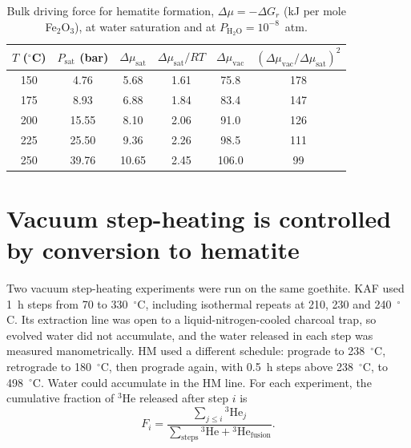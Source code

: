 \begin{table}
  \centering
  \caption{Bulk driving force for hematite formation, $\Delta\mu = -\Delta G_r$ (kJ per mole Fe$_2$O$_3$), at water saturation and at $P_{\mathrm{H_2O}} = 10^{-8}$~atm.}
  \label{tab:gt_dmu}
  \begin{tabular}{cccccc}
    \hline
    $T$ ($^\circ$C) & $P_{\mathrm{sat}}$ (bar) & $\Delta\mu_{\mathrm{sat}}$ & $\Delta\mu_{\mathrm{sat}}/RT$ & $\Delta\mu_{\mathrm{vac}}$ & $(\Delta\mu_{\mathrm{vac}}/\Delta\mu_{\mathrm{sat}})^2$ \\
    \hline
    150 & 4.76  & 5.68  & 1.61 & 75.8  & 178 \\
    175 & 8.93  & 6.88  & 1.84 & 83.4  & 147 \\
    200 & 15.55 & 8.10  & 2.06 & 91.0  & 126 \\
    225 & 25.50 & 9.36  & 2.26 & 98.5  & 111 \\
    250 & 39.76 & 10.65 & 2.45 & 106.0 & 99  \\
    \hline
  \end{tabular}
\end{table}

\section{Vacuum step-heating is controlled by conversion to hematite}
\label{sec:gt_vacuum}

Two vacuum step-heating experiments were run on the same goethite. KAF used 1~h steps from
70 to 330~$^\circ$C, including isothermal repeats at 210, 230 and 240~$^\circ$C. Its extraction
line was open to a liquid-nitrogen-cooled charcoal trap, so evolved water did not accumulate,
and the water released in each step was measured manometrically. HM used a different schedule:
prograde to 238~$^\circ$C, retrograde to 180~$^\circ$C, then prograde again, with 0.5~h steps
above 238~$^\circ$C, to 498~$^\circ$C. Water could accumulate in the HM line. For each experiment, the cumulative
fraction of $^3$He released after step $i$ is
\begin{equation}
  F_i = \frac{\sum_{j\le i} {}^3\mathrm{He}_j}{\sum_{\mathrm{steps}} {}^3\mathrm{He} + {}^3\mathrm{He}_{\mathrm{fusion}}} .
\end{equation}

